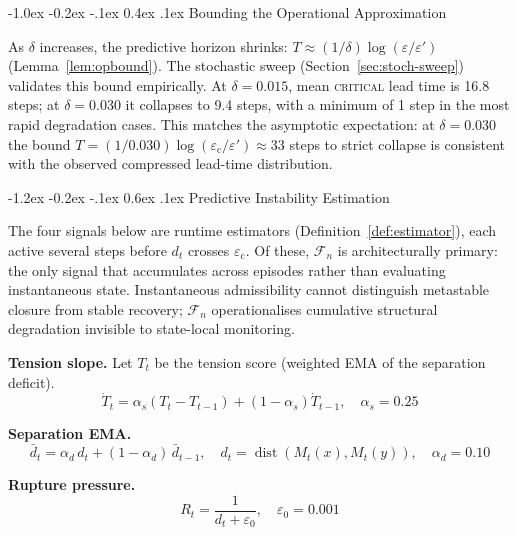 \documentclass{llncs}
\makeatletter
\renewcommand\section{\@startsection{section}{1}{\z@}%
  {-1.2ex \@plus -0.2ex \@minus -.1ex}%
  {0.6ex \@plus .1ex}%
  {\normalfont\large\bfseries}}
\renewcommand\subsection{\@startsection{subsection}{2}{\z@}%
  {-1.0ex \@plus -0.2ex \@minus -.1ex}%
  {0.4ex \@plus .1ex}%
  {\normalfont\normalsize\bfseries}}
\DeclareMathOperator{\dist}{dist}
\newcommand{\ecollapse}{\varepsilon_{\mathrm{c}}}
\newcommand{\st}[1]{\textup{\textsc{#1}}}
\makeatother
\begin{document}
\subsection{Bounding the Operational Approximation}
\label{sec:opbound-empirical}

As $\delta$ increases, the predictive horizon shrinks:
$T \approx (1/\delta)\log(\varepsilon/\varepsilon')$
(Lemma~\ref{lem:opbound}). The stochastic sweep
(Section~\ref{sec:stoch-sweep}) validates this bound empirically. At
$\delta = 0.015$, mean \st{critical} lead time is 16.8 steps; at $\delta
= 0.030$ it collapses to 9.4 steps, with a minimum of 1 step in the
most rapid degradation cases. This matches the asymptotic expectation:
at $\delta = 0.030$ the bound $T = (1/0.030)\log(\ecollapse/\varepsilon')
\approx 33$ steps to strict collapse is consistent with the observed
compressed lead-time distribution.

\section{Predictive Instability Estimation}
\label{sec:estimators}

The four signals below are runtime estimators
(Definition~\ref{def:estimator}), each active several steps before
$d_t$ crosses $\ecollapse$. Of these, $\mathcal{F}_n$ is
architecturally primary: the only signal that accumulates across
episodes rather than evaluating instantaneous state. Instantaneous
admissibility cannot distinguish metastable closure from stable
recovery; $\mathcal{F}_n$ operationalises cumulative structural
degradation invisible to state-local monitoring.

\textbf{Tension slope.}
Let $T_t$ be the tension score (weighted EMA of the separation deficit).
\begin{equation}
  \dot{T}_t = \alpha_s (T_t - T_{t-1}) + (1-\alpha_s)\dot{T}_{t-1},
  \quad \alpha_s = 0.25
  \label{eq:slope}
\end{equation}

\textbf{Separation EMA.}
\begin{equation}
  \bar{d}_t = \alpha_d\, d_t + (1-\alpha_d)\,\bar{d}_{t-1},
  \quad d_t = \dist(M_t(x), M_t(y)),
  \quad \alpha_d = 0.10
  \label{eq:sep-ema}
\end{equation}

\textbf{Rupture pressure.}
\begin{equation}
  R_t = \frac{1}{d_t + \varepsilon_0}, \quad \varepsilon_0 = 0.001
  \label{eq:rp}
\end{equation}
\end{document}
